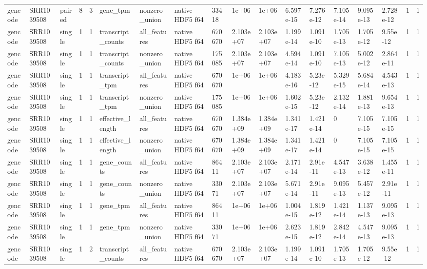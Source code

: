 \begin{tabular}{llllllllllllllllll}
gencode & SRR1039508 & paired & 8 & 3 & gene\_tpm & nonzero\_union & native HDF5 f64 & 33418 & 1e+06 & 1e+06 & 6.597e-15 & 7.276e-12 & 7.105e-14 & 9.095e-13 & 2.728e-12 & 1 & 1 \\
gencode & SRR1039508 & single & 1 & 1 & transcript\_counts & all\_features & native HDF5 f64 & 670670 & 2.103e+07 & 2.103e+07 & 1.199e-14 & 1.091e-10 & 1.705e-13 & 1.705e-12 & 9.55e-12 & 1 & 1 \\
gencode & SRR1039508 & single & 1 & 1 & transcript\_counts & nonzero\_union & native HDF5 f64 & 175085 & 2.103e+07 & 2.103e+07 & 4.594e-14 & 1.091e-10 & 7.105e-13 & 5.002e-12 & 2.864e-11 & 1 & 1 \\
gencode & SRR1039508 & single & 1 & 1 & transcript\_tpm & all\_features & native HDF5 f64 & 670670 & 1e+06 & 1e+06 & 4.183e-16 & 5.23e-12 & 5.329e-15 & 5.684e-14 & 4.543e-13 & 1 & 1 \\
gencode & SRR1039508 & single & 1 & 1 & transcript\_tpm & nonzero\_union & native HDF5 f64 & 175085 & 1e+06 & 1e+06 & 1.602e-15 & 5.23e-12 & 2.132e-14 & 1.881e-13 & 9.654e-13 & 1 & 1 \\
gencode & SRR1039508 & single & 1 & 1 & effective\_length & all\_features & native HDF5 f64 & 670670 & 1.384e+09 & 1.384e+09 & 1.341e-17 & 1.421e-14 & 0 & 7.105e-15 & 7.105e-15 & 1 & 1 \\
gencode & SRR1039508 & single & 1 & 1 & effective\_length & nonzero\_union & native HDF5 f64 & 670670 & 1.384e+09 & 1.384e+09 & 1.341e-17 & 1.421e-14 & 0 & 7.105e-15 & 7.105e-15 & 1 & 1 \\
gencode & SRR1039508 & single & 1 & 1 & gene\_counts & all\_features & native HDF5 f64 & 86411 & 2.103e+07 & 2.103e+07 & 2.171e-14 & 2.91e-11 & 4.547e-13 & 3.638e-12 & 1.455e-11 & 1 & 1 \\
gencode & SRR1039508 & single & 1 & 1 & gene\_counts & nonzero\_union & native HDF5 f64 & 33071 & 2.103e+07 & 2.103e+07 & 5.671e-14 & 2.91e-11 & 9.095e-13 & 5.457e-12 & 2.91e-11 & 1 & 1 \\
gencode & SRR1039508 & single & 1 & 1 & gene\_tpm & all\_features & native HDF5 f64 & 86411 & 1e+06 & 1e+06 & 1.004e-15 & 1.819e-12 & 1.421e-14 & 1.137e-13 & 9.095e-13 & 1 & 1 \\
gencode & SRR1039508 & single & 1 & 1 & gene\_tpm & nonzero\_union & native HDF5 f64 & 33071 & 1e+06 & 1e+06 & 2.623e-15 & 1.819e-12 & 2.842e-14 & 4.547e-13 & 9.095e-13 & 1 & 1 \\
gencode & SRR1039508 & single & 1 & 2 & transcript\_counts & all\_features & native HDF5 f64 & 670670 & 2.103e+07 & 2.103e+07 & 1.199e-14 & 1.091e-10 & 1.705e-13 & 1.705e-12 & 9.55e-12 & 1 & 1 \\

\end{tabular}
